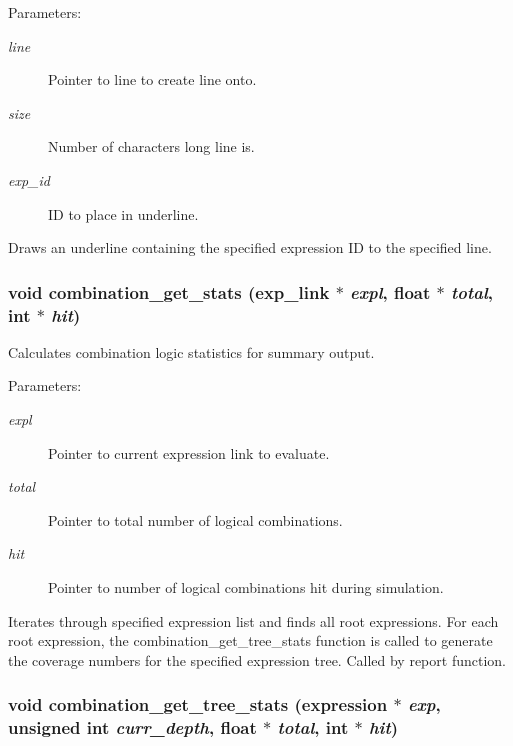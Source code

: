 \begin{Desc}
\item[Parameters:]
\begin{description}
\item[{\em line}]Pointer to line to create line onto. \item[{\em size}]Number of characters long line is. \item[{\em exp\_\-id}]ID to place in underline.\end{description}
\end{Desc}
Draws an underline containing the specified expression ID to the specified line. 
\subsubsection{\setlength{\rightskip}{0pt plus 5cm}void combination\_\-get\_\-stats ({\bf exp\_\-link} $\ast$ {\em expl}, float $\ast$ {\em total}, int $\ast$ {\em hit})}\label{comb_8c_a7}


Calculates combination logic statistics for summary output.

\begin{Desc}
\item[Parameters:]
\begin{description}
\item[{\em expl}]Pointer to current expression link to evaluate. \item[{\em total}]Pointer to total number of logical combinations. \item[{\em hit}]Pointer to number of logical combinations hit during simulation.\end{description}
\end{Desc}
Iterates through specified expression list and finds all root expressions. For each root expression, the combination\_\-get\_\-tree\_\-stats function is called to generate the coverage numbers for the specified expression tree. Called by report function. 
\subsubsection{\setlength{\rightskip}{0pt plus 5cm}void combination\_\-get\_\-tree\_\-stats ({\bf expression} $\ast$ {\em exp}, unsigned int {\em curr\_\-depth}, float $\ast$ {\em total}, int $\ast$ {\em hit})}\label{comb_8c_a6}


